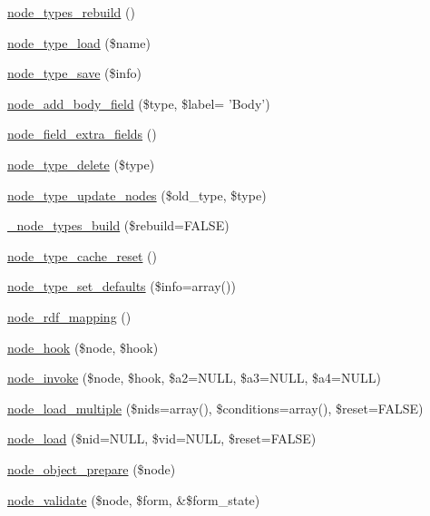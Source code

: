 \begin{DoxyCompactItemize}
\item 
\hyperlink{node_8module_a0d871bf17b30ff5048cbc1abff3a075a}{node\_\-types\_\-rebuild} ()
\item 
\hyperlink{node_8module_a96fe260f0247f9be132f0ce33016120d}{node\_\-type\_\-load} (\$name)
\item 
\hyperlink{node_8module_a9a5c06f9903cea586bd44a7d6e9e086c}{node\_\-type\_\-save} (\$info)
\item 
\hyperlink{node_8module_ae42eca558c69d1e327c82a554ceba42f}{node\_\-add\_\-body\_\-field} (\$type, \$label= 'Body')
\item 
\hyperlink{node_8module_aeeec04be4558239e02b0b25151c7bf7d}{node\_\-field\_\-extra\_\-fields} ()
\item 
\hyperlink{node_8module_a7fe2d244b6635513800a027053144425}{node\_\-type\_\-delete} (\$type)
\item 
\hyperlink{node_8module_a03c4318dce6050b7330af9cea8f3e420}{node\_\-type\_\-update\_\-nodes} (\$old\_\-type, \$type)
\item 
\hyperlink{node_8module_a31b891b6c1ffba98fd4478e4255e301b}{\_\-node\_\-types\_\-build} (\$rebuild=FALSE)
\item 
\hyperlink{node_8module_ab31c73f858b4ebc9dbfb9915f4ea01ce}{node\_\-type\_\-cache\_\-reset} ()
\item 
\hyperlink{node_8module_a09f802ffaf307aebf9578a93fed025f9}{node\_\-type\_\-set\_\-defaults} (\$info=array())
\item 
\hyperlink{node_8module_a3e5e89ef9ef3f9f5ea3772b0c75c4ac1}{node\_\-rdf\_\-mapping} ()
\item 
\hyperlink{node_8module_a5170e943f79e97ec35c73f178cc4068a}{node\_\-hook} (\$node, \$hook)
\item 
\hyperlink{node_8module_a1902c3061c34578c266d8171644b18f0}{node\_\-invoke} (\$node, \$hook, \$a2=NULL, \$a3=NULL, \$a4=NULL)
\item 
\hyperlink{node_8module_a12f29f65250380f9e592d8d5497313e3}{node\_\-load\_\-multiple} (\$nids=array(), \$conditions=array(), \$reset=FALSE)
\item 
\hyperlink{node_8module_a492ddfc12843e71242bb484a44e51a19}{node\_\-load} (\$nid=NULL, \$vid=NULL, \$reset=FALSE)
\item 
\hyperlink{node_8module_ac12e464390fef44e55ddc2e0a35e9fe2}{node\_\-object\_\-prepare} (\$node)
\item 
\hyperlink{node_8module_a9f5f6b14ffa70a478e11e60b1fe9d254}{node\_\-validate} (\$node, \$form, \&\$form\_\-state)
\item 

\end{DoxyCompactItemize}

